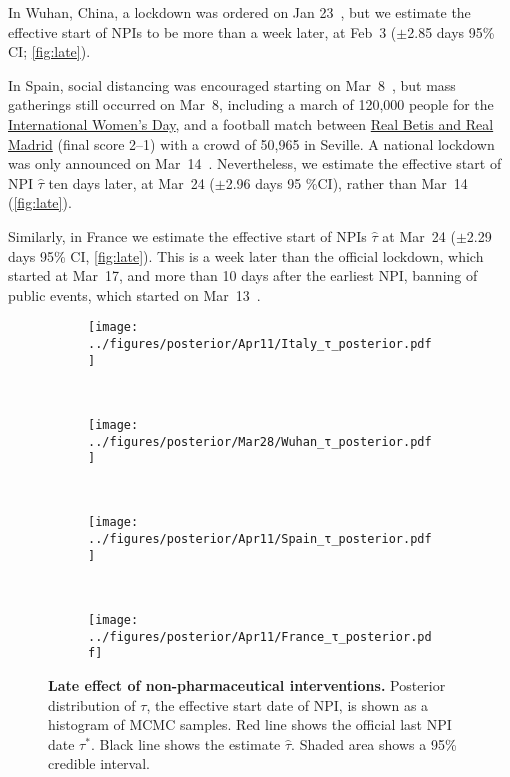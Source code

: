 \documentclass[12pt]{extarticle}
\begin{document}
In Wuhan, China, a lockdown was ordered on Jan 23~\citep{Li2020}, but we estimate the effective start of NPIs to be more than a week later, at Feb~3 ($\pm$2.85 days 95\% CI; \autoref{fig:late}).

In Spain, social distancing was encouraged starting on Mar~8~\citep{Flaxman2020}, but mass gatherings still occurred on Mar~8, including a march of 120,000 people for the \href{https://www.nytimes.com/2020/03/13/world/europe/spain-coronavirus-emergency.html}{International Women's Day}, and a  football match between \href{https://www.espn.com/soccer/match?gameId=550350}{Real Betis and Real Madrid} (final score 2--1) with a crowd of 50,965 in Seville.
A national lockdown was only announced on Mar~14~\citep{Flaxman2020}.
Nevertheless, we estimate the effective start of NPI $\hat{\tau}$ ten days later, at Mar~24 ($\pm$2.96 days 95 \%CI), rather than Mar~14 (\autoref{fig:late}).

Similarly, in France we estimate the effective start of NPIs $\hat{\tau}$ at Mar~24 ($\pm$2.29 days 95\% CI, \autoref{fig:late}).
This is a week later than the official lockdown, which started at Mar~17, and more than 10 days after the earliest NPI, banning of public events, which started on Mar~13~\citep{Flaxman2020}.



\begin{figure}[h]
    \centering
    \begin{subfigure}{0.45\textwidth}
        \texttt{[image: ../figures/posterior/Apr11/Italy\_τ\_posterior.pdf]}
    \end{subfigure}
  	~
    \begin{subfigure}{0.45\textwidth}
        \texttt{[image: ../figures/posterior/Mar28/Wuhan\_τ\_posterior.pdf]}
    \end{subfigure}
    \\
    \begin{subfigure}{0.45\textwidth}
        \texttt{[image: ../figures/posterior/Apr11/Spain\_τ\_posterior.pdf]}
    \end{subfigure}
    ~
    \begin{subfigure}{0.45\textwidth}
		\texttt{[image: ../figures/posterior/Apr11/France\_τ\_posterior.pdf]}
    \end{subfigure}
    \caption{
	\textbf{Late effect of non-pharmaceutical interventions.}
    Posterior distribution of $\tau$, the effective start date of NPI, is shown as a histogram of MCMC samples. Red line shows the official last NPI date $\tau^*$. Black line shows the estimate $\hat{\tau}$. Shaded area shows a 95\% credible interval. 
    }
    \label{fig:late}
\end{figure}
\end{document}
